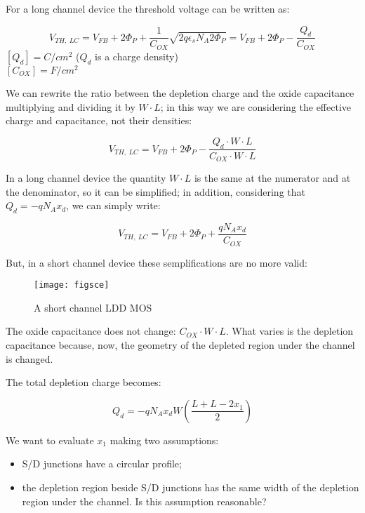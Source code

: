 \documentclass[a4paper, 12pt, twoside, openright]{report}
\begin{document}
{{{{For a long channel device the threshold voltage can be written as:

	\begin{equation}
	V_{TH,\ LC} = V_{FB} + 2\Phi_P + \frac{1}{C_{OX}} \sqrt{2q \epsilon_s N_A 2 \Phi_P} = V_{FB} + 2\Phi_P - \frac{Q_d}{C_{OX}}
	\end{equation}
	$[Q_{d}] = C/cm^2$ ($Q_{d}$ is a charge density)\\
	$[C_{OX}] = F/cm^2$

We can rewrite the ratio between the depletion charge and the oxide capacitance multiplying and dividing it by $W \cdot L$; in this way we are considering the effective charge and capacitance, not their densities:

	\begin{equation}
	V_{TH,\ LC} = V_{FB} + 2\Phi_P - \frac{Q_d \cdot W \cdot L}{C_{OX} \cdot W \cdot L}
	\end{equation}

In a long channel device the quantity $W \cdot L$ is the same at the numerator and at the denominator, so it can be simplified; in addition, considering that $Q_d = -q N_A x_d$, we can simply write:

	\begin{equation}
	V_{TH,\ LC} = V_{FB} + 2\Phi_P + \frac{q N_A x_d}{C_{OX}}
	\end{equation}

But, in a short channel device these semplifications are no more valid:

	\begin{figure}[H]
	\centering
	\texttt{[image: figsce]}
	\caption{A short channel LDD MOS}
	\label{figsce}
	\end{figure}

The oxide capacitance does not change: $C_{OX} \cdot W \cdot L$. What varies is the depletion capacitance because, now, the geometry of the depleted region under the channel is changed.

The total depletion charge becomes:

\begin{equation}
Q_d = -q N_A x_d W \left( \frac{L + L - 2x_1}{2} \right)
\end{equation}

We want to evaluate $x_{1}$ making two assumptions:

	\begin{itemize}
	\item S/D junctions have a circular profile;
	\item the depletion region beside S/D junctions has the same width of the depletion region under the channel. Is this assumption reasonable?
	

\end{itemize}}}}}
\end{document}
